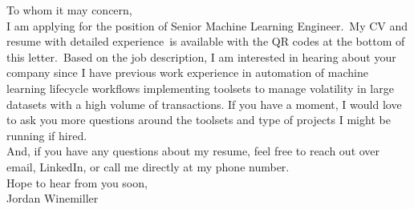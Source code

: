 
\begin{flushleft}
    \large{
        To whom it may concern,\\
        \vspace*{0.1 in}
        I am applying for the position of Senior Machine Learning Engineer.\ My CV and
        resume with detailed experience\ is available with the QR codes at the
        bottom of this letter.\ Based on the job description, I am interested in
        hearing about your company since I have previous work experience in
        automation of machine learning lifecycle workflows implementing toolsets
        to manage volatility in large datasets with a high volume of transactions.
        If you have a moment, I would love to ask you more questions around the
        toolsets and type of projects I might be running if hired.\\
        \vspace*{0.1 in}
        And, if you have any questions about my resume, feel free to reach out over
        email, LinkedIn, or call me directly at my phone number.\\
        \vspace*{0.1 in}
        Hope to hear from you soon,\\
        \vspace*{0.1 in}
        Jordan Winemiller
    }
\end{flushleft}
